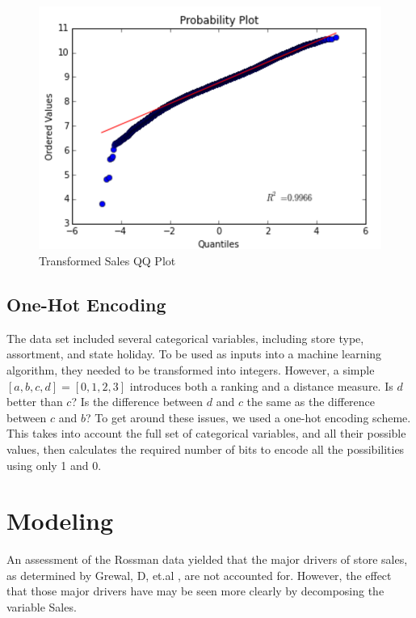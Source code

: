 \documentclass[DIV=calc, paper=a4, fontsize=11pt]{scrartcl}	 %
\begin{document}
\begin{figure}[!htbp]
\centering
\caption{Transformed Sales QQ Plot}
\label{normalqq}
\includegraphics[scale=0.75]{figures/salesnormalQQ.png}
\end{figure} 

\subsection*{One-Hot Encoding}
The data set included several categorical variables, including store type, assortment, and state holiday. To be used as inputs into a machine learning algorithm, they needed to be transformed into integers. However, a simple $[a, b, c, d] = [0, 1, 2, 3]$ introduces both a ranking and a distance measure. Is $d$ better than $c$? Is the difference between $d$ and $c$ the same as the difference between $c$ and $b$? To get around these issues, we used a one-hot encoding scheme. This takes into account the full set of categorical variables, and all their possible values, then calculates the required number of bits to encode all the possibilities using only 1 and 0. 

\section*{Modeling}

An assessment of the Rossman data yielded that the major drivers of store sales, as determined by Grewal, D, et.al \cite{Grewal}, are not accounted for. However, the effect that those major drivers have may be seen more clearly by decomposing the variable Sales. 
\end{document}
